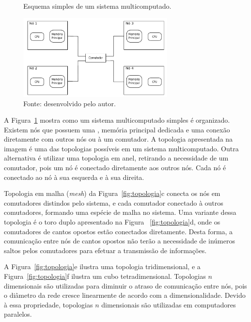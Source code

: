 \begin{figure}[t]
	\centering
    \caption{Esquema simples de um sistema multicomputado.}
        \includegraphics[width=0.7\textwidth]{figs/multicomp.pdf}
        \caption*{Fonte: desenvolvido pelo autor.}
        \label{fig:multicomputado}
\end{figure}



A Figura~\ref{fig:multicomputado} mostra como um sistema multicomputado simples é
organizado. Existem nós que possuem uma \cpu, memória principal dedicada e uma
conexão diretamente com outros nós ou à um comutador. A topologia apresentada na
imagem é uma das topologias possíveis em um sistema multicomputado. Outra
alternativa é utilizar uma topologia em anel, retirando a necessidade de um
comutador, pois um nó é conectado diretamente aos outros nós. Cada nó é
conectado ao nó à sua esquerda e à sua direita.

Topologia em malha (\textit{mesh}) da Figura~\ref{fig:topologia}c conecta os nós
em comutadores distindos pelo sistema, e cada comutador conectado à outros
comutadores, formando uma espécie de malha no sistema. Uma variante dessa
topologia é o toro duplo apresentado na Figura ~\ref{fig:topologia}d, onde os
comutadores de cantos opostos estão conectados diretamente. Desta forma, a
comunicação entre nós de cantos opostos não terão a necessidade de inúmeros
saltos pelos comutadores para efetuar a transmissão de informações.

A Figura~\ref{fig:topologia}e ilustra uma topologia tridimensional, e a
Figura~\ref{fig:topologia}f ilustra um cubo tetradimensional. Topologias
$n$ dimensionais são utilizadas para diminuir o atraso de comunicação entre nós,
pois o diâmetro da rede cresce linearmente de acordo com a dimensionalidade.
Devido à essa propriedade, topologias $n$ dimensionais são utilizadas em
computadores paralelos.




